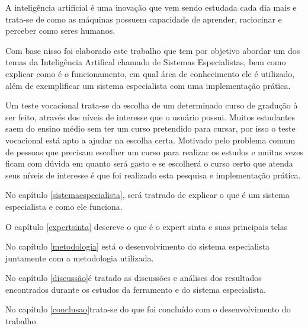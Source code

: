 A inteligência artificial é uma inovação que vem sendo estudada cada dia mais e trata-se de como as máquinas possuem capacidade de aprender, raciocinar e perceber como seres humanos.

Com base nisso foi elaborado este trabalho que tem por objetivo abordar um dos temas da Inteligência Artifical chamado de Sistemas Especialistas, bem como explicar como é o funcionamento, em qual área de conhecimento ele é utilizado, além de exemplificar um sistema especialista com uma implementação prática. 

Um teste vocacional trata-se da escolha de um determinado curso de gradução à ser feito, através dos níveis de interesse que o usuário possui. Muitos estudantes saem do ensino médio sem ter um curso pretendido para cursar, por isso o teste vocacional está apto a ajudar na escolha certa. Motivado pelo problema comum de pessoas que precisam escolher um curso para realizar os estudos e muitas vezes ficam com dúvida em quanto será gasto e se escolherá o curso certo que atenda seus níveis de interesse é que foi realizado esta pesquisa e implementação prática.

No capítulo \ref{sistemaespecialista}, será tratrado de explicar o que é um sistema especialista e como ele funciona.

O capítulo \ref{expertsinta} descreve o que é o expert sinta e suas principais telas

No capítulo \ref{metodologia} está o desenvolvimento do sistema especialista juntamente com a metodologia utilizada.

No capítulo \ref{discussão}é tratado as discussões e análises dos resultados encontrados durante os estudos da ferramento e do sistema especialista.

No capítulo \ref{conclusao}trata-se do que foi concluído com o desenvolvimento do trabalho.